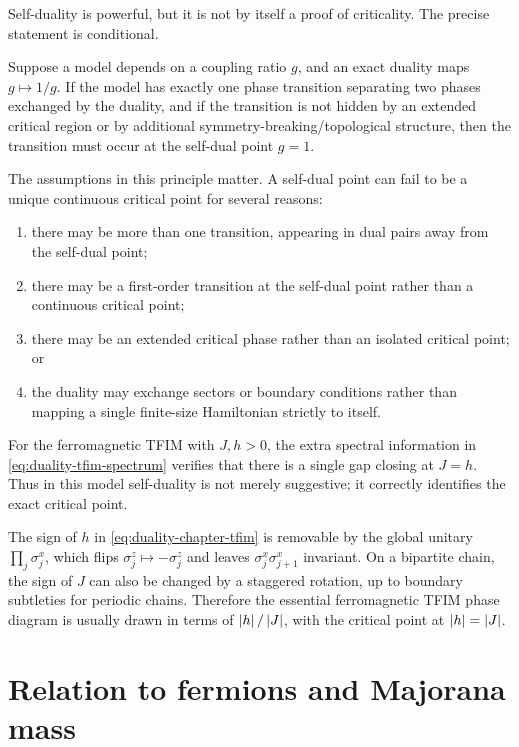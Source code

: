 Self-duality is powerful, but it is not by itself a proof of criticality.  The
precise statement is conditional.

\begin{principle}
Suppose a model depends on a coupling ratio $g$, and an exact duality maps
$g\mapsto 1/g$.  If the model has exactly one phase transition separating two
phases exchanged by the duality, and if the transition is not hidden by an
extended critical region or by additional symmetry-breaking/topological
structure, then the transition must occur at the self-dual point $g=1$.
\end{principle}

The assumptions in this principle matter.  A self-dual point can fail to be a
unique continuous critical point for several reasons:
\begin{enumerate}[label=(\roman*)]
    \item there may be more than one transition, appearing in dual pairs away
    from the self-dual point;
    \item there may be a first-order transition at the self-dual point rather
    than a continuous critical point;
    \item there may be an extended critical phase rather than an isolated
    critical point; or
    \item the duality may exchange sectors or boundary conditions rather than
    mapping a single finite-size Hamiltonian strictly to itself.
\end{enumerate}
For the ferromagnetic TFIM with $J,h>0$, the extra spectral information in
\cref{eq:duality-tfim-spectrum} verifies that there is a single gap closing at
$J=h$.  Thus in this model self-duality is not merely suggestive; it correctly
identifies the exact critical point.

\begin{remark}
The sign of $h$ in \cref{eq:duality-chapter-tfim} is removable by the global
unitary $\prod_j\sigma_j^x$, which flips $\sigma_j^z\mapsto-\sigma_j^z$ and leaves
$\sigma_j^x\sigma_{j+1}^x$ invariant.  On a bipartite chain, the sign of $J$ can
also be changed by a staggered rotation, up to boundary subtleties for periodic
chains.  Therefore the essential ferromagnetic TFIM phase diagram is usually
drawn in terms of $\left|h\right|/\left|J\right|$, with the critical point at
$\left|h\right|=\left|J\right|$.
\end{remark}

\section{Relation to fermions and Majorana mass}
\label{sec:duality-fermions-majorana-mass}

